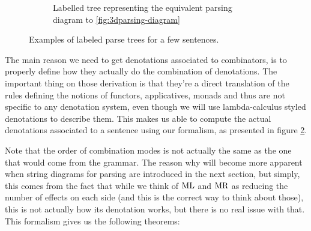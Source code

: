 \begin{figure}
	\begin{subfigure}{.45\textwidth}
		\centering
		\caption{Labelled tree representing the equivalent parsing diagram to
			\ref{fig:3dparsing-diagram}}
		\label{fig:tree-rain}
	\end{subfigure}
	\caption{Examples of labeled parse trees for a few sentences.}
	\label{fig:parsing-trees}
\end{figure}

The main reason we need to get denotations associated to combinators, is to
properly define how they actually do the combination of denotations.
The important thing on those derivation is that they're a direct translation
of the rules defining the notions of functors, applicatives, monads and thus
are not specific to any denotation system, even though we will use
lambda-calculus styled denotations to describe them.
This makes us able to compute the actual denotations associated to a sentence
using our formalism, as presented in figure \ref{fig:parsing-trees}.

Note that the order of combination modes is not actually the same as the one
that would come from the grammar.
The reason why will become more apparent when string diagrams for parsing are
introduced in the next section, but simply, this comes from the fact that while
we think of $\text{ML}$ and $\text{MR}$ as reducing the number of effects on each
side (and this is the correct way to think about those), this is not actually
how its denotation works, but there is no real issue with that.
This formalism gives us the following theorems:

